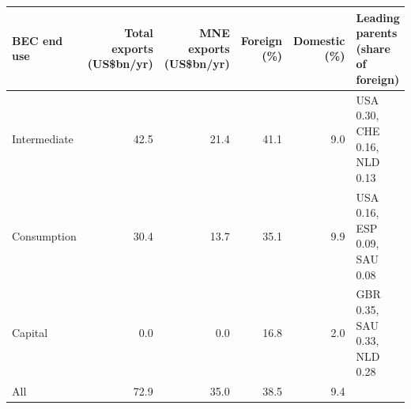 \begin{tabular}{@{}l r r r r l@{}}
\toprule
BEC end use & Total exports (US\$bn/yr) & MNE exports (US\$bn/yr) & Foreign (\%) & Domestic (\%) & Leading parents (share of foreign) \\
\midrule
Intermediate & 42.5 & 21.4 & 41.1 & 9.0 & USA 0.30, CHE 0.16, NLD 0.13 \\
Consumption & 30.4 & 13.7 & 35.1 & 9.9 & USA 0.16, ESP 0.09, SAU 0.08 \\
Capital & 0.0 & 0.0 & 16.8 & 2.0 & GBR 0.35, SAU 0.33, NLD 0.28 \\
\midrule
All & 72.9 & 35.0 & 38.5 & 9.4 & \\
\bottomrule
\end{tabular}
